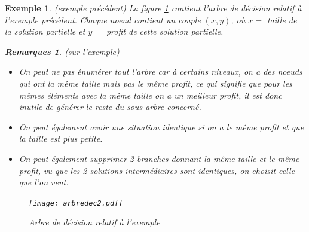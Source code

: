 \documentclass[12pt]{article}
\newtheorem{exemple}{Exemple}[section]
\newtheorem{rems}{Remarques}[section]
\begin{document}
\begin{exemple}(exemple précédent) La figure \ref{bigtree} contient l'arbre de décision relatif à l'exemple précédent. Chaque noeud contient
un couple $(x,y)$, où $x=$ taille de la solution partielle et $y=$ profit de cette solution partielle. \\

\begin{rems}(sur l'exemple)
\begin{itemize}
\item On peut ne pas énumérer tout l'arbre car à certains niveaux, on a des noeuds qui ont la même taille mais pas le même profit, ce qui
signifie que pour les mêmes éléments avec la même taille on a un meilleur profit, il est donc inutile de générer le reste du sous-arbre
concerné.
\item On peut également avoir une situation identique si on a le même profit et que la taille est plus petite.
\item On peut également supprimer 2 branches donnant la même taille et le même profit, vu que les 2 solutions intermédiaires sont identiques,
on choisit celle que l'on veut.
\end{itemize}
\end{rems}

\begin{figure}[H]
    \begin{center}
    \texttt{[image: arbredec2.pdf]}
    \caption{Arbre de décision relatif à l'exemple}
    \label{bigtree}
    \end{center}
\end{figure}
\end{exemple}
$ $\\
\end{document}
